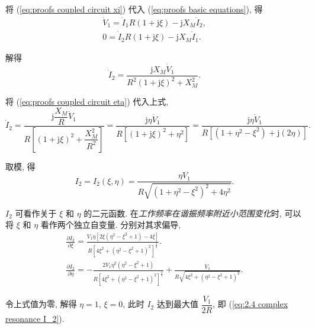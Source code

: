 将 (\ref{eq:proofs coupled circuit xi}) 代入 (\ref{eq:proofs basic equations}), 得
\begin{gather}
    \dot{V}_1=\dot{I}_1R(1+\mathrm{j}\xi)-\mathrm{j}X_M\dot{I}_2, \\
    0=\dot{I}_2R(1+\mathrm{j}\xi)-\mathrm{j}X_M\dot{I}_1.
\end{gather}

解得
\begin{equation}
    \dot{I}_2=\frac{\mathrm{j}X_M\dot{V}_1}{R^2(1+\mathrm{j}\xi)^2+X_M^2}.
\end{equation}

将 (\ref{eq:proofs coupled circuit eta}) 代入上式,
\begin{equation}
    \dot{I}_2=\frac{\mathrm{j}\dfrac{X_M}{R}\dot{V}_1}{R\left[(1+\mathrm{j}\xi)^2+\dfrac{X_M^2}{R^2}\right]}=\frac{\mathrm{j}\eta\dot{V}_1}{R[(1+\mathrm{j}\xi)^2+\eta^2]}=\frac{\mathrm{j}\eta\dot{V}_1}{R[(1+\eta^2-\xi^2)+\mathrm{j}(2\eta)]}.
\end{equation}

取模, 得
\begin{equation}
    I_2=I_2(\xi,\eta)=\frac{\eta V_1}{R\sqrt{(1+\eta^2-\xi^2)^2+4\eta^2}}.
\end{equation}

$I_2$ 可看作关于 $\xi$ 和 $\eta$ 的二元函数. 在\textit{工作频率在谐振频率附近小范围变化}时, 可以将 $\xi$ 和 $\eta$ 看作两个独立自变量. 分别对其求偏导,
\begin{gather}
    \frac{\partial I_2}{\partial\xi}=\frac{V_{1} \eta \left[2 \xi \left(\eta^{2} - \xi^{2} + 1\right) - 4 \xi\right]}{R \left[4 \xi^{2} + \left(\eta^{2} - \xi^{2} + 1\right)^{2}\right]^{\frac{3}{2}}}. \\
    \frac{\partial I_2}{\partial\eta}=- \frac{2 V_{1} \eta^{2} \left(\eta^{2} - \xi^{2} + 1\right)}{R \left[4 \xi^{2} + \left(\eta^{2} - \xi^{2} + 1\right)^{2}\right]^{\frac{3}{2}}} + \frac{V_{1}}{R \sqrt{4 \xi^{2} + \left(\eta^{2} - \xi^{2} + 1\right)^{2}}}.
\end{gather}

令上式值为零, 解得 $\eta=1$, $\xi=0$, 此时 $I_2$ 达到最大值 $\dfrac{V_1}{2R}$, 即 (\ref{eq:2.4 complex resonance I_2}).
